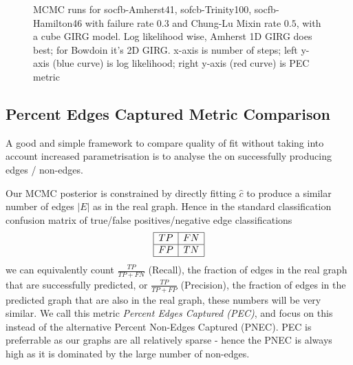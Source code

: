 \begin{figure}



  \caption{MCMC runs for socfb-Amherst41, sofcb-Trinity100, socfb-Hamilton46 with failure rate $0.3$ and Chung-Lu Mixin rate $0.5$, with a cube GIRG model. Log likelihood wise, Amherst 1D GIRG does best; for Bowdoin it's 2D GIRG.
  x-axis is number of steps; left y-axis (blue curve) is log likelihood; right y-axis (red curve) is PEC metric}
  \label{fig:mcmc_runs}
\end{figure}

\subsection{Percent Edges Captured Metric Comparison}
A good and simple framework to compare quality of fit without taking into account increased parametrisation is to analyse the  on successfully producing edges / non-edges.

Our MCMC posterior is constrained by directly fitting $\hat{c}$ to produce a similar number of edges $|E|$ as in the real graph. Hence in the standard classification confusion matrix of true/false positives/negative edge classifications
\begin{equation}
  \begin{array}{|c|c|}
    \hline
    TP & FN \\
    \hline
    FP & TN \\
    \hline
    \end{array}
\end{equation}
we can equivalently count $\frac{TP}{TP + FN}$ (Recall), the fraction of edges in the real graph that are successfully predicted, or $\frac{TP}{TP + FP}$ (Precision), the fraction of edges in the predicted graph that are also in the real graph, these numbers will be very similar. We call this metric \textit{Percent Edges Captured (PEC)}, and focus on this instead of the alternative Percent Non-Edges Captured (PNEC). PEC is preferrable as our graphs are all relatively sparse - hence the PNEC is always high as it is dominated by the large number of non-edges.


